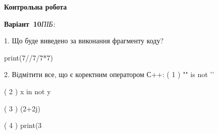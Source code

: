 \documentclass[11pt]{article}
\begin{document}
{\large\textbf{Контрольна робота}}

\textbf{Варіант \No\,10}\hfill \textit{ПІБ:}\,\underline{\hspace{60mm}}
\vspace{4mm}

1. Що буде виведено за виконання фрагменту коду?

print(7//7/7*7)


2. %
Відмітити все, що є коректним оператором С++:
( 1 ) "\n" is not '\n'

( 2 ) x in not y

( 3 ) (2+2j)%

( 4 ) print(3%


\newpage
\end{document}
